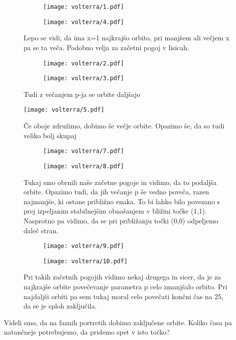 \documentclass{article}
\begin{document}
\begin{figure}[H]
\centering
\begin{subfigure}{.49\textwidth}
\texttt{[image: volterra/1.pdf]}
\end{subfigure}
\begin{subfigure}{.49\textwidth}
\texttt{[image: volterra/4.pdf]}
\end{subfigure}
\caption*{Lepo se vidi, da ima x=1 najkrajšo orbito, pri manjšem ali večjem x pa se ta veča. Podobno velja za začetni pogoj v lisicah.}
\end{figure}

\begin{figure}[H]
\centering
\begin{subfigure}{.49\textwidth}
\texttt{[image: volterra/2.pdf]}
\end{subfigure}
\begin{subfigure}{.49\textwidth}
\texttt{[image: volterra/3.pdf]}
\end{subfigure}
\caption*{Tudi z večanjem p-ja se orbite daljšajo}
\end{figure}

\begin{figure}[H]
\centering
\texttt{[image: volterra/5.pdf]}
\caption*{Če oboje združimo, dobimo še večje orbite. Opazimo še, da so tudi veliko bolj skupaj}
\end{figure}

\begin{figure}[H]
\centering
\begin{subfigure}{.49\textwidth}
\texttt{[image: volterra/7.pdf]}
\end{subfigure}
\begin{subfigure}{.49\textwidth}
\texttt{[image: volterra/8.pdf]}
\end{subfigure}
\caption*{Tukaj smo obrnili naše začetne pogoje in vidimo, da to podaljša orbite. Opazimo tudi, da jih večanje p še vedno poveča, razen najmanjše, ki ostane približno enaka. To bi lahko bilo povezano s prej izpeljanim stabilnejšim obnašanjem v bližini točke (1,1). Nasprotno pa vidimo, da se pri približanju točki (0,0) odpeljemo daleč stran.}
\end{figure}

\begin{figure}[H]
\centering
\begin{subfigure}{.49\textwidth}
\texttt{[image: volterra/9.pdf]}
\end{subfigure}
\begin{subfigure}{.49\textwidth}
\texttt{[image: volterra/10.pdf]}
\end{subfigure}
\caption*{Pri takih začetnih pogojih vidimo nekaj drugega in sicer, da je za najkrajše orbite povečevanje parametra p celo zmanjšalo orbito. Pri najdaljši orbiti pa sem tukaj moral celo povečati končni čas na 25, da se je sploh zaključila.}
\end{figure}
\newpage
Videli smo, da na faznih portretih dobimo zaključene orbite. Koliko časa pa natančneje potrebujemo, da pridemo spet v isto točko?
\end{document}
